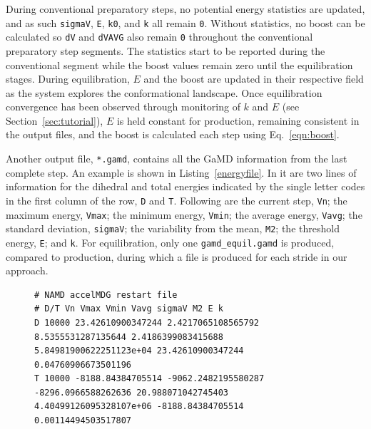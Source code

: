 \documentclass[9pt,tutorial]{livecoms}
\begin{document}
During conventional preparatory steps, no potential energy statistics are updated, and as such \texttt{sigmaV}, \texttt{E}, \texttt{k0}, and \texttt{k} all remain \texttt{0}. Without statistics, no boost can be calculated so \texttt{dV} and \texttt{dVAVG} also remain \texttt{0} throughout the conventional preparatory step segments. The statistics start to be reported during the conventional segment while the boost values remain zero until the equilibration stages. During equilibration, $E$ and the boost are updated in their respective field as the system explores the conformational landscape. Once equilibration convergence has been observed through monitoring of $k$ and $E$ (see Section~\ref{sec:tutorial}), $E$ is held constant for production, remaining consistent in the output files, and the boost is calculated each step using Eq.~\ref{eqn:boost}. 

Another output file, \texttt{*.gamd}, contains all the GaMD information from the last complete step. An example is shown in Listing~\ref{energyfile}. In it are two lines of information for the dihedral and total energies indicated by the single letter codes in the first column of the row, \texttt{D} and \texttt{T}. Following are the current step, \texttt{Vn}; the maximum energy, \texttt{Vmax}; the minimum energy, \texttt{Vmin}; the average energy, \texttt{Vavg}; the standard deviation, \texttt{sigmaV}; the variability from the mean, \texttt{M2}; the threshold energy, \texttt{E}; and \texttt{k}. For equilibration, only one \texttt{gamd\_equil.gamd} is produced, compared to production, during which a file is produced for each stride in our approach. 

\begin{figure}
\begin{lstlisting}[label=energyfile,caption= Example of *.gamd file, basicstyle=\small,breaklines=true, backgroundcolor=\color{light-gray}]
# NAMD accelMDG restart file
# D/T Vn Vmax Vmin Vavg sigmaV M2 E k
D 10000 23.42610900347244 2.4217065108565792 8.5355531287135644 2.4186399083415688 5.84981900622251123e+04 23.42610900347244 0.04760906673501196
T 10000 -8188.84384705514 -9062.2482195580287 -8296.0966588262636 20.988071042745403 4.40499126095328107e+06 -8188.84384705514 0.00114494503517807             
\end{lstlisting}
\end{figure}
\end{document}
